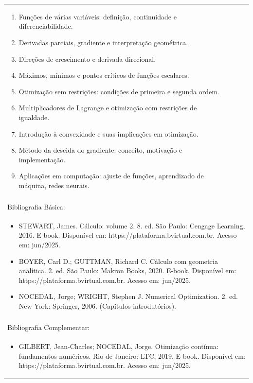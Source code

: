 \documentclass[11pt]{article}
\begin{document}
\begin{center}
\begin{longtable}{|p{4cm}|p{4cm}|p{4cm}|p{4cm}|}
{\begin{enumerate}
\item Funções de várias variáveis: definição, continuidade e diferenciabilidade.
\item Derivadas parciais, gradiente e interpretação geométrica.
\item Direções de crescimento e derivada direcional.
\item Máximos, mínimos e pontos críticos de funções escalares.
\item Otimização sem restrições: condições de primeira e segunda ordem.
\item Multiplicadores de Lagrange e otimização com restrições de igualdade.
\item Introdução à convexidade e suas implicações em otimização.
\item Método da descida do gradiente: conceito, motivação e implementação.
\item Aplicações em computação: ajuste de funções, aprendizado de máquina, redes neurais.\end{enumerate}}\\
\multicolumn{4}{|p{16cm}|}{}\\
\hline
\multicolumn{4}{|p{16cm}|}{Bibliografia Básica:}\\
\multicolumn{4}{|p{\dimexpr 16cm + 6\tabcolsep\relax}|}{%
\begin{itemize}\item STEWART, James. Cálculo: volume 2. 8. ed. São Paulo: Cengage Learning, 2016. E-book. Disponível em: https://plataforma.bvirtual.com.br. Acesso em: jun/2025.
\item BOYER, Carl D.; GUTTMAN, Richard C. Cálculo com geometria analítica. 2. ed. São Paulo: Makron Books, 2020. E-book. Disponível em: https://plataforma.bvirtual.com.br. Acesso em: jun/2025.
\item NOCEDAL, Jorge; WRIGHT, Stephen J. Numerical Optimization. 2. ed. New York: Springer, 2006. (Capítulos introdutórios).\end{itemize}}\\
\multicolumn{4}{|p{16cm}|}{}\\
\hline
\multicolumn{4}{|p{16cm}|}{Bibliografia Complementar:}\\
\multicolumn{4}{|p{\dimexpr 16cm + 6\tabcolsep\relax}|}{%
\begin{itemize}\item GILBERT, Jean-Charles; NOCEDAL, Jorge. Otimização contínua: fundamentos numéricos. Rio de Janeiro: LTC, 2019. E-book. Disponível em: https://plataforma.bvirtual.com.br. Acesso em: jun/2025.

\end{itemize}}
\end{longtable}
\end{center}
\end{document}
